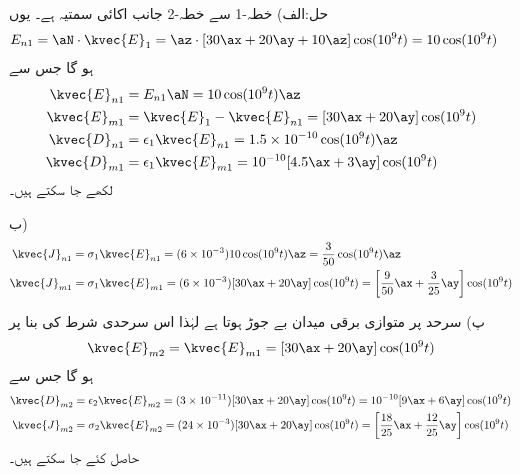 حل:الف) خطہ-1 سے خطہ-2 جانب اکائی سمتیہ  ہے۔ یوں
\begin{align*}
E_{n1}&=\aN \cdot \kvec{E}_1=\az \cdot [30 \ax+20\ay+10\az] \cos (10^9 t) =10 \cos (10^9 t)
\end{align*}
ہو گا جس سے
\begin{align*}
\kvec{E}_{n1}&=E_{n1} \aN=10 \cos (10^9 t) \az\\
\kvec{E}_{m1}&=\kvec{E}_1-\kvec{E}_{n1}=[30\ax+20\ay]\cos (10^9 t)\\
\kvec{D}_{n1}&=\epsilon_1 \kvec{E}_{n1}=1.5\times 10^{-10}\cos (10^9 t) \az\\
\kvec{D}_{m1}&=\epsilon_1 \kvec{E}_{m1}=10^{-10} [4.5\ax+3\ay]\cos(10^9 t)
\end{align*}
لکھے جا سکتے ہیں۔

ب) 
\begin{align*}
\kvec{J}_{n1}&=\sigma_1 \kvec{E}_{n1}=(6\times 10^{-3})10 \cos (10^9 t) \az=\frac{3}{50}\cos (10^9 t)\az\\
\kvec{J}_{m1}&=\sigma_1 \kvec{E}_{m1}=(6\times 10^{-3})[30\ax+20\ay]\cos (10^9 t)=\left[\frac{9}{50}\ax+\frac{3}{25}\ay\right]\cos (10^9 t)
\end{align*}

پ) سرحد پر متوازی برقی میدان بے جوڑ ہوتا ہے لہٰذا اس سرحدی شرط کی بنا پر
\begin{align*}
\kvec{E}_{m2}=\kvec{E}_{m1}=[30\ax+20\ay]\cos (10^9 t)
\end{align*}
ہو گا جس سے 
\begin{align*}
\kvec{D}_{m2}&=\epsilon_2 \kvec{E}_{m2}=(3\times 10^{-11})[30\ax+20\ay]\cos (10^9 t)=10^{-10}[9\ax+6\ay]\cos (10^9 t)\\
\kvec{J}_{m2}&=\sigma_2 \kvec{E}_{m2}=(24\times 10^{-3})[30\ax+20\ay]\cos (10^9 t)=\left[\frac{18}{25}\ax+\frac{12}{25}\ay\right]\cos (10^9 t)
\end{align*}
حاصل کئے جا سکتے ہیں۔

